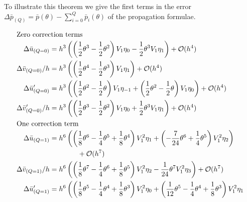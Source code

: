 To illustrate this theorem we give the first terms in the error $\Delta \bar{p}_{(Q)} = \bar{p}(\theta) - \displaystyle\sum_{i=0}^{Q} \bar{p}_{i}(\theta)$  of the propagation formulae.

\begin{align*}
    \intertext{Zero correction terms}
    \Delta \bar{u}_{(Q=0)}    & = h^{3}\left(\left(\frac{1}{2} \theta^{3} - \frac{1}{2} \theta^{2}\right) V_{1} \eta_{0} -\frac{1}{2} \theta^{3} V_{1} \eta_{1}\right) + \mathcal{O}(h^{4})                                                                              \\
    \Delta \bar{v}_{(Q=0)}/h  & = h^{3}\left(\left(\frac{1}{2} \theta^{4} - \frac{1}{2} \theta^{3}\right) V_{1} \eta_{1}\right) + \mathcal{O}(h^{4})                                                                                                                     \\
    \Delta \bar{u}'_{(Q=0)}   & = h^{3}\left(\left(\frac{1}{2} \theta^{2} - \frac{1}{2} \theta\right) V_{1} \eta_{-1} + \left(\frac{1}{2} \theta^{2} - \frac{1}{2} \theta\right) V_{1} \eta_{0}\right) + \mathcal{O}(h^{4})                                              \\
    \Delta \bar{v}'_{(Q=0)}/h & = h^{3}\left(\left(\frac{1}{2} \theta^{3} - \frac{1}{2} \theta^{2}\right) V_{1} \eta_{0} + \frac{1}{2} \theta^{3} V_{1} \eta_{1}\right) + \mathcal{O}(h^{4})                                                                             \\
    \intertext{One correction term}
    \Delta \bar{u}_{(Q=1)}    & = h^{6}\left(\left(\frac{1}{8} \theta^{6} - \frac{1}{4} \theta^{5} + \frac{1}{8} \theta^{4}\right) V_{1}^{2} \eta_{1} + \left(-\frac{7}{24} \theta^{6} + \frac{1}{4} \theta^{5}\right) V_{1}^{2} \eta_{2}\right)                         \\
                              & \qquad\qquad + \mathcal{O}(h^{7})                                                                                                                                                                                                        \\
    \Delta\bar{v}_{(Q=1)}/h   & = h^{6}\left(\left(\frac{1}{8} \theta^{7} - \frac{1}{4} \theta^{6} + \frac{1}{8} \theta^{5}\right) V_{1}^{2} \eta_{2} -\frac{1}{24} \theta^{7} V_{1}^{2} \eta_{3}\right) + \mathcal{O}(h^{7})                                            \\
    \Delta \bar{u}'_{(Q=1)}   & = h^{6}\left(\left(\frac{1}{8} \theta^{5} - \frac{1}{4} \theta^{4} + \frac{1}{8} \theta^{3}\right) V_{1}^{2} \eta_{0} + \left(\frac{1}{12} \theta^{5} - \frac{1}{4} \theta^{4} + \frac{1}{8} \theta^{3}\right) V_{1}^{2} \eta_{1}\right. \\

\end{align*}
